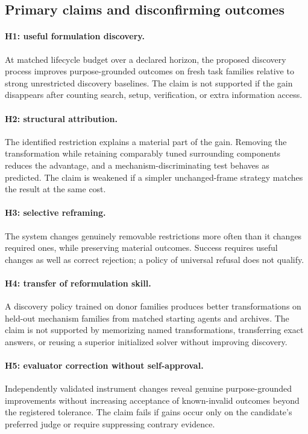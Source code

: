 \documentclass[11pt,letterpaper]{article}
\theoremstyle{remark}\newtheorem{remark}{Remark}[section]
\begin{document}
\subsection{Primary claims and disconfirming outcomes}
\paragraph{H1: useful formulation discovery.}
At matched lifecycle budget over a declared horizon, the proposed discovery process improves purpose-grounded outcomes on fresh task families relative to strong unrestricted discovery baselines. The claim is not supported if the gain disappears after counting search, setup, verification, or extra information access.

\paragraph{H2: structural attribution.}
The identified restriction explains a material part of the gain. Removing the transformation while retaining comparably tuned surrounding components reduces the advantage, and a mechanism-discriminating test behaves as predicted. The claim is weakened if a simpler unchanged-frame strategy matches the result at the same cost.

\paragraph{H3: selective reframing.}
The system changes genuinely removable restrictions more often than it changes required ones, while preserving material outcomes. Success requires useful changes as well as correct rejection; a policy of universal refusal does not qualify.

\paragraph{H4: transfer of reformulation skill.}
A discovery policy trained on donor families produces better transformations on held-out mechanism families from matched starting agents and archives. The claim is not supported by memorizing named transformations, transferring exact answers, or reusing a superior initialized solver without improving discovery.

\paragraph{H5: evaluator correction without self-approval.}
Independently validated instrument changes reveal genuine purpose-grounded improvements without increasing acceptance of known-invalid outcomes beyond the registered tolerance. The claim fails if gains occur only on the candidate's preferred judge or require suppressing contrary evidence.
\end{document}
